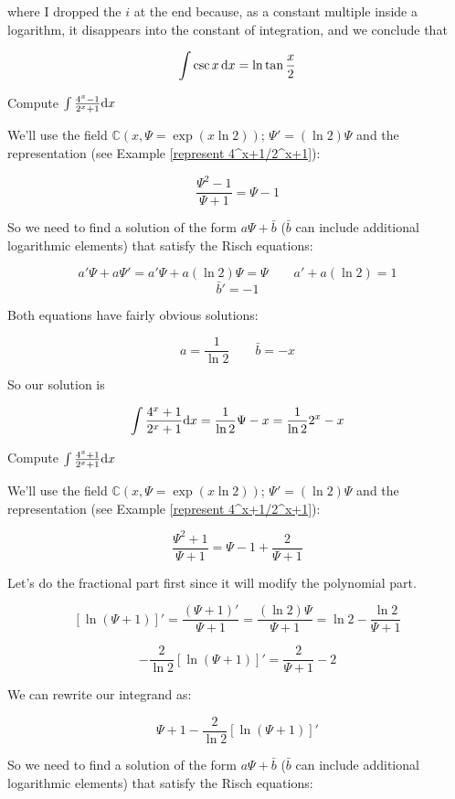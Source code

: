 where I dropped the $i$ at the end because, as a constant multiple
inside a logarithm, it disappears into the constant of integration,
and we conclude that

$$\int \csc x \,{\rm d}x = \ln \tan {x\over2} $$

\endexample

\vfil\eject

\example Compute $\int {{4^x-1}\over{2^x+1}} {\rm d}x$
\label{integrate 4^x-1/2^x+1}

We'll use the field ${\mathbb C}(x,\Psi = \exp(x \ln 2))$; $\Psi' =
(\ln 2)\Psi$ and the representation (see Example
\ref{represent 4^x+1/2^x+1}):

$$ \frac{\Psi^2-1}{\Psi+1} = \Psi-1$$

So we need to find a solution of the form $a\Psi + \bar{b}$ ($\bar{b}$
can include additional logarithmic elements) that satisfy the Risch
equations:

$$a'\Psi + a\Psi' = a'\Psi + a(\ln 2)\Psi = \Psi \qquad a' + a(\ln 2) = 1$$
$$\bar{b}' = -1$$

Both equations have fairly obvious solutions:

$$a = \frac{1}{\ln 2} \qquad \bar{b}=-x$$

So our solution is

$$\int {{4^x+1}\over{2^x+1}} {\rm d}x = \frac{1}{\ln 2}\Psi - x =
\frac{1}{\ln 2}2^x - x$$

\endexample


\vfil\eject

\example Compute $\int {{4^x+1}\over{2^x+1}} {\rm d}x$
\label{integrate 4^x+1/2^x+1}

We'll use the field ${\mathbb C}(x,\Psi = \exp(x \ln 2))$; $\Psi' =
(\ln 2)\Psi$ and the representation (see Example
\ref{represent 4^x+1/2^x+1}):

$$ \frac{\Psi^2+1}{\Psi+1} = \Psi-1+\frac{2}{\Psi+1}$$

Let's do the fractional part first since it will modify the polynomial
part.

$$\left[\ln(\Psi+1)\right]' = \frac{(\Psi + 1)'}{\Psi+1} = \frac{(\ln
2)\Psi}{\Psi + 1} = \ln 2 - \frac{\ln 2}{\Psi+1}$$

$$-\frac{2}{\ln 2}\left[\ln(\Psi+1)\right]' = \frac{2}{\Psi+1} - 2$$

We can rewrite our integrand as:

$$ \Psi + 1 - \frac{2}{\ln 2}\left[\ln(\Psi+1)\right]'$$

So we need to find a solution of the form $a\Psi + \bar{b}$ ($\bar{b}$
can include additional logarithmic elements) that satisfy the Risch
equations:

